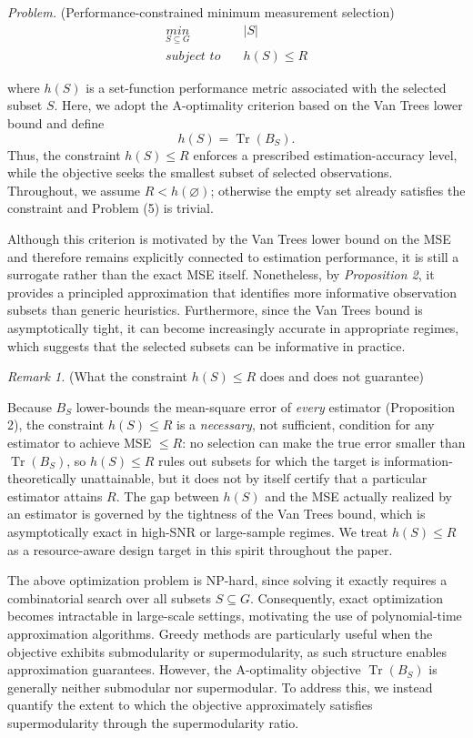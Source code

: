\documentclass[letterpaper, 10 pt, conference]{ieeeconf}  %
\begin{document}
\noindent \textit{Problem.} (Performance-constrained minimum measurement selection)
\begin{equation}
\begin{aligned}
\underset{S \subseteq G}{\textit{min}} \quad & |S| \\
\textit{subject to} \quad & h(S) \le R
\end{aligned}
\end{equation}

\noindent where \(h(S)\) is a set-function performance metric associated with the selected subset \(S\). Here, we adopt the A-optimality criterion based on the Van Trees lower bound and define
\[
h(S)=\operatorname{Tr}(B_S).
\]
Thus, the constraint \(h(S)\le R\) enforces a prescribed estimation-accuracy level, while the objective seeks the smallest subset of selected observations. Throughout, we assume \(R<h(\varnothing)\); otherwise the empty set already satisfies the constraint and Problem (5) is trivial.

Although this criterion is motivated by the Van Trees lower bound on the MSE and therefore remains explicitly connected to estimation performance, it is still a surrogate rather than the exact MSE itself. Nonetheless, by \textit{Proposition 2}, it provides a principled approximation that identifies more informative observation subsets than generic heuristics. Furthermore, since the Van Trees bound is asymptotically tight, it can become increasingly accurate in appropriate regimes, which suggests that the selected subsets can be informative in practice.

\noindent \textit{Remark 1.} (What the constraint \(h(S)\le R\) does and does not guarantee)

Because \(B_S\) lower-bounds the mean-square error of \emph{every} estimator (Proposition 2), the constraint \(h(S)\le R\) is a \emph{necessary}, not sufficient, condition for any estimator to achieve MSE \(\le R\): no selection can make the true error smaller than \(\operatorname{Tr}(B_S)\), so \(h(S)\le R\) rules out subsets for which the target is information-theoretically unattainable, but it does not by itself certify that a particular estimator attains \(R\). The gap between \(h(S)\) and the MSE actually realized by an estimator is governed by the tightness of the Van Trees bound, which is asymptotically exact in high-SNR or large-sample regimes. We treat \(h(S)\le R\) as a resource-aware design target in this spirit throughout the paper.

The above optimization problem is NP-hard, since solving it exactly requires a combinatorial search over all subsets \(S\subseteq G\). Consequently, exact optimization becomes intractable in large-scale settings, motivating the use of polynomial-time approximation algorithms. Greedy methods are particularly useful when the objective exhibits submodularity or supermodularity, as such structure enables approximation guarantees. However, the A-optimality objective \(\operatorname{Tr}(B_S)\) is generally neither submodular nor supermodular. To address this, we instead quantify the extent to which the objective approximately satisfies supermodularity through the supermodularity ratio.
\end{document}
